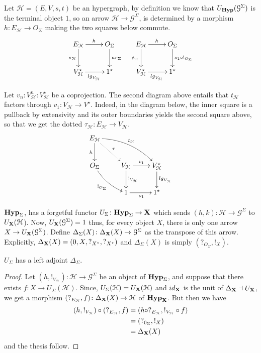 \documentclass[runningheads,envcountsect]{lipics-v2021}
\newcommand{\lgh}{\mathsf{lg}}
\def\X{\textbf {\textup{X}}}
\newcommand{\catname}[1]{\textbf{\textup{#1}}}
\newcommand{\hyp}{\catname{Hyp}}
\newcommand{\ari}{\mathsf{ar}}
\newcommand{\id}[1]{\mathsf{id}_{#1}}
\begin{document}
\begin{remark}\label{rem:label}	
	Let $\mathcal{H}=(E, V, s, t)$ be an hypergraph, by definition we know that $U_{\hyp}(\mathcal{G}^{\Sigma})$ is the terminal object $1$, so an arrow $\mathcal{H}\rightarrow \mathcal{G}^{\Sigma}$, is determined by a morphism $h\colon E_\mathcal{H}\to O_\Sigma$  making the two squares below commute.
	\[\xymatrix{E_{\mathcal{H}} \ar[r]^{h} \ar[d]_{s_{\mathcal{H}}}& O_\Sigma \ar[d]^{\ari_\Sigma}& E_{\mathcal{H}} \ar[r]^{h} \ar[d]_{t_{\mathcal{H}}} & O_\Sigma \ar[d]^{o_1\circ !_{O_\Sigma}}\\ V^\star_{\mathcal{{H}}} \ar[r]_{\lgh_{V_{\mathcal{H}}}}& 1^\star & V^\star_{\mathcal{{H}}} \ar[r]_{\lgh_{V_{\mathcal{H}}}} & 1^\star}\]
	
	Let $v_n\colon V^n_\mathcal{H}\colon  V^\star_{\mathcal{H}}$ be a coprojection.  The second diagram above entails that $t_{\mathcal{H}}$ factors through $v_1\colon V_{\mathcal{H}}\to V^{\star}$. Indeed, in the diagram below, the inner square is a pullback by extensivity and its outer boundaries yields the second square above, so that we get the dotted $\tau_{\mathcal{H}}\colon E_{\mathcal{H}}\to V_{\mathcal{H}}$.
	\[\xymatrix{E_{\mathcal{H}} \ar@{.>}[dr]^{\tau}\ar@/^.4cm/[drr]^{t_{\mathcal{H}}} \ar[d]_{h} \\	O_\Sigma \ar@/_.2cm/[dr]_{!_{O_\Sigma}}&V_{\mathcal{H}} \ar[r]^{v_1}\ar[d]^{!_{V_\mathcal{H}}}& V^\star_{\mathcal{H}} \ar[d]^{\lgh_{V_{\mathcal{H}}}}\\ & 1 \ar[r]_{o_1}& 1^\star}\]
\end{remark}

$\hyp_{\Sigma}$, has a forgetful functor $U_{\Sigma}\colon \hyp_{\Sigma}\to \X$ which sends $(h,k)\colon \mathcal{H}\to \mathcal{G}^{\Sigma}$ to $U_{\X}(\mathcal{H}$). Now, $U_{\X}(\mathcal{G}^{\Sigma})=1$ thus, for every object $X$, there is only one arrow $X\to U_{\X}(\mathcal{G}^{\Sigma})$. Define $\Delta_{\Sigma}(X)\colon \Delta_{\X}(X)\to \mathcal{G}^{\Sigma}$ as the transpose of this arrow. Explicitly, $\Delta_{\X}(X)=(0, X, ?_{X^\star}, ?_{X^\star})$ and $\Delta_\Sigma(X)$ is simply $(?_{O_\Sigma}, !_{X})$.

\begin{proposition} $U_\Sigma$
	has a left adjoint $\Delta_\Sigma$.
\end{proposition}
\begin{proof}Let $(h, !_{V_\mathcal{H}})\colon \mathcal{H}\to \mathcal{G}^{\Sigma}$ be an object of $\hyp_{\Sigma}$, and suppose that there exists $f\colon X\to U_{\Sigma}(\mathcal{H})$. Since, $U_{\Sigma}(\mathcal{H})=U_{\X}(\mathcal{H})$ and $\id{\X}$ is the unit of $\Delta_\X \dashv U_{\X}$, we get a morphism $(?_{E_{\mathcal{H}}},f)\colon \Delta_{\X}(X)\to \mathcal{H}$ of $\hyp_\X$. But then we have
	\begin{align*}
		(h, !_{V_{\mathcal{{H}}}})\circ (?_{E_{\mathcal{H}}}, f)&=(h\circ ?_{E_{\mathcal{H}}}, !_{V_{\mathcal{{H}}}}\circ f)\\&=(?_{0_{\Sigma}}, !_{X})\\&=\Delta_{\X}(X)
	\end{align*}
and the thesis follow.   
\end{proof}
\end{document}
